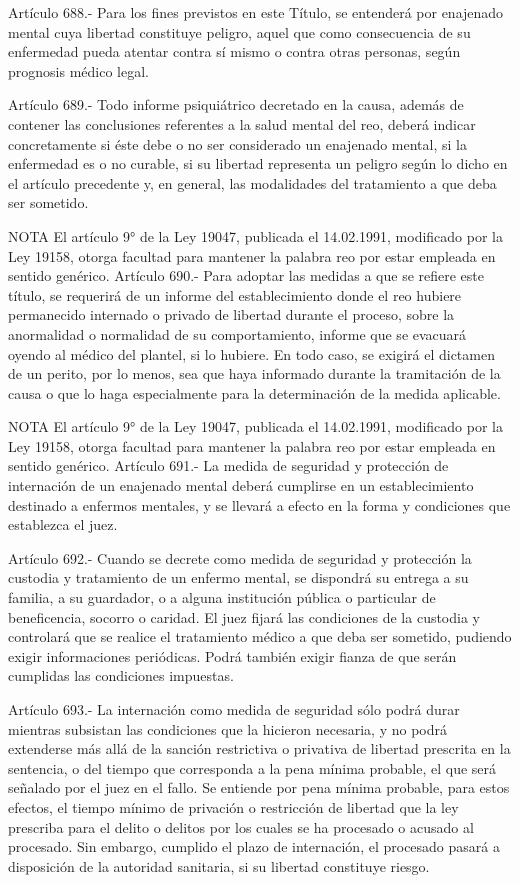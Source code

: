    Artículo 688.- Para los fines previstos en este Título, se entenderá por enajenado mental cuya libertad constituye peligro, aquel que como consecuencia de su enfermedad pueda atentar contra sí mismo o contra otras personas, según prognosis médico legal.

    Artículo 689.- Todo informe psiquiátrico decretado en la causa, además de contener las conclusiones referentes a la salud mental del reo, deberá indicar concretamente si éste debe o no ser considerado un enajenado mental, si la enfermedad es o no curable, si su libertad representa un peligro según lo dicho en el artículo precedente y, en general, las modalidades del tratamiento a que deba ser sometido.




NOTA
      El artículo 9° de la Ley 19047, publicada el 14.02.1991, modificado por la Ley 19158, otorga facultad para mantener la palabra reo por estar empleada en sentido genérico.
    Artículo 690.- Para adoptar las medidas a que se refiere este título, se requerirá de un informe del establecimiento donde el reo  hubiere permanecido internado o privado de libertad durante el proceso, sobre la anormalidad o normalidad de su comportamiento, informe que se evacuará oyendo al médico del plantel, si lo hubiere. En todo caso, se exigirá el dictamen de un perito, por lo menos, sea que haya informado durante la tramitación de la causa o que lo haga especialmente para la determinación de la medida aplicable.



NOTA
      El artículo 9° de la Ley 19047, publicada el 14.02.1991, modificado por la Ley 19158, otorga facultad para mantener la palabra reo por estar empleada en sentido genérico.
    Artículo 691.- La medida de seguridad y protección de internación de un enajenado mental deberá cumplirse en un establecimiento destinado a enfermos mentales, y se llevará a efecto en la forma y condiciones que establezca el juez.

    Artículo 692.- Cuando se decrete como medida de seguridad y protección la custodia y tratamiento de un enfermo mental, se dispondrá su entrega a su familia, a su guardador, o a alguna institución pública o particular de beneficencia, socorro o caridad. El juez fijará las condiciones de la custodia y controlará que se realice el tratamiento médico a que deba ser sometido, pudiendo exigir informaciones periódicas. Podrá también exigir fianza de que serán cumplidas las condiciones impuestas.

    Artículo 693.- La internación como medida de seguridad sólo podrá durar mientras subsistan las condiciones que la hicieron necesaria, y no podrá extenderse más allá de la sanción restrictiva o privativa de libertad prescrita en la sentencia, o del tiempo que corresponda a la pena mínima probable, el que será señalado por el juez en el fallo.
    Se entiende por pena mínima probable, para estos efectos, el tiempo mínimo de privación o restricción de libertad que la ley prescriba para el delito o delitos por los cuales se ha procesado o acusado al procesado.
    Sin embargo, cumplido el plazo de internación, el procesado pasará a disposición de la autoridad sanitaria, si su libertad constituye riesgo.




